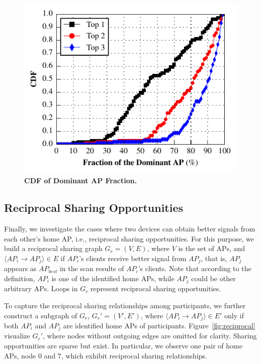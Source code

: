 \begin{figure}[t]
  \centering
  \includegraphics[width=\columnwidth]{./figures/DominantNeighborAPFigure.pdf}
  \caption{\textbf{CDF of Dominant AP Fraction.}}
  \label{fig:dominantap}
\end{figure}

\subsection{Reciprocal Sharing Opportunities}
\label{subsec:reciprocal}

Finally, we investigate the cases where two devices can obtain better signals
from each other's home AP, i.e., reciprocal sharing opportunities. For this
purpose, we build a reciprocal sharing graph $G_r=(V, E)$, where $V$ is the set
of APs, and $\langle AP_i \rightarrow AP_j \rangle \in E$ if $AP_i$'s clients
receive better signal from $AP_j$, that is, $AP_j$ appears as $AP_{best}$ in the
scan results of $AP_i$'s clients. Note that according to the definition, $AP_i$
is one of the identified home APs, while $AP_j$ could be other arbitrary APs.
Loops in $G_r$ represent reciprocal sharing opportunities.

To capture the reciprocal sharing relationships among \PhoneLab{} participants,
we further construct a subgraph of $G_r$, $G_r'=(V', E')$, where $\langle AP_i
\rightarrow AP_j \rangle \in E'$ only if both $AP_i$ and $AP_j$ are identified
home APs of \PhoneLab{} participants. Figure~\ref{fig:reciprocal} visualize
$G_r'$, where nodes without outgoing edges are omitted for clarity. Sharing
opportunities are sparse but exist. In particular, we observe one pair of home
APs, node 0 and 7, which exhibit reciprocal sharing relationships.

